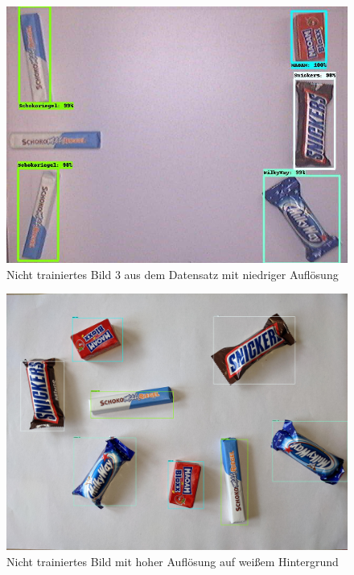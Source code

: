     \begin{figure}[H]
        \centering
        \includegraphics[angle = 90, width = \textwidth]{Bilder/models/model_comparison/efficientdet_d1_coco17_tpu-32/non_trained_3.jpg}
        \caption{Nicht trainiertes Bild 3 aus dem Datensatz mit niedriger Auflösung}
    \end{figure}
    
    \begin{figure}[H]
        \centering
        \includegraphics[angle = 90, width = \textwidth]{Bilder/models/model_comparison/efficientdet_d1_coco17_tpu-32/HD_on_white.jpg}
        \caption{Nicht trainiertes Bild mit hoher Auflösung auf weißem Hintergrund}
    \end{figure}
    
